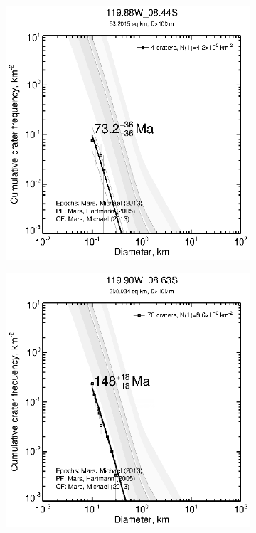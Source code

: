 \documentclass[12pt,letter]{article}
\begin{document}
\begin{figure}[h]
\begin{subfigure}{.33\textwidth}
\end{subfigure}
\begin{subfigure}{.33\textwidth}
  \includegraphics[width=\linewidth,clip,trim=1cm 1cm 1.5cm 1cm]{figures/craterstats/119-88W_08-44S_100m_cum.eps}
\end{subfigure}
\begin{subfigure}{.33\textwidth}
  \includegraphics[width=\linewidth,clip,trim=1cm 1cm 1.5cm 1cm]{figures/craterstats/119-90W_08-63S_100m_cum.eps}

\end{subfigure}
\end{figure}
\end{document}
